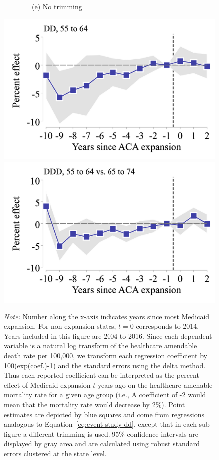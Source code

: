 \documentclass[12pt]{article}%
\begin{document}
\begin{appendices}
\begin{figure}
\begin{minipage}{\linewidth}
\begin{minipage}{.49\linewidth}
        \begin{flushleft}
        ~~~~~~~~(e) No trimming \\
        \end{flushleft}
        \centering
        \includegraphics[width=.48\linewidth]{../output/figures/event_study_55_64_ln_amenable_trim_1000.png}
        \includegraphics[width=.48\linewidth]{../output/figures/event_study_ddd_ln_amenable_trim_1000.png} 
      \end{minipage}
                  \begin{justify}
                {\footnotesize
                    \emph{Note:} 
                    Number along the x-axis indicates years since most Medicaid expansion. For non-expansion states, $t = 0$ corresponds to 2014. Years included in this figure are 2004 to 2016. Since each dependent variable is a natural log transform of the healthcare amendable death rate per 100,000, we transform each regression coefficient by 100(exp(coef.)-1) and the standard errors using the delta method. 
           Thus each reported coefficient can be interpreted as the percent effect of Medicaid expansion $t$ years ago on the healthcare amenable mortality rate for a given age group (i.e., A coefficient of -2 would mean that the mortality rate would decrease by 2\%).
    Point estimates are depicted by blue squares and come from regressions analogous to Equation~\ref{eq:event-study-dd}, except that in each sub-figure a different trimming is used. 
    95\% confidence intervals are displayed by gray area and are calculated using robust standard errors clustered at the state level.
                \par}
            \end{justify}
       \end{minipage}
\end{figure}



\end{appendices}
\end{document}
